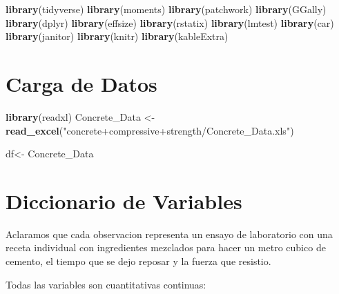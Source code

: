 \documentclass[
]{book}
\newenvironment{Shaded}{\begin{snugshade}}{\end{snugshade}}
\newcommand{\FunctionTok}[1]{\textcolor[rgb]{0.13,0.29,0.53}{\textbf{#1}}}
\newcommand{\NormalTok}[1]{#1}
\newcommand{\OtherTok}[1]{\textcolor[rgb]{0.56,0.35,0.01}{#1}}
\newcommand{\StringTok}[1]{\textcolor[rgb]{0.31,0.60,0.02}{#1}}
\begin{document}
\begin{Shaded}
\begin{Highlighting}[]
\FunctionTok{library}\NormalTok{(tidyverse) }
\FunctionTok{library}\NormalTok{(moments) }
\FunctionTok{library}\NormalTok{(patchwork) }
\FunctionTok{library}\NormalTok{(GGally) }
\FunctionTok{library}\NormalTok{(dplyr) }
\FunctionTok{library}\NormalTok{(effsize) }
\FunctionTok{library}\NormalTok{(rstatix)}
\FunctionTok{library}\NormalTok{(lmtest)   }
\FunctionTok{library}\NormalTok{(car)      }
\FunctionTok{library}\NormalTok{(janitor)  }
\FunctionTok{library}\NormalTok{(knitr)}
\FunctionTok{library}\NormalTok{(kableExtra)}
\end{Highlighting}
\end{Shaded}

\section{Carga de Datos}\label{carga-de-datos}

\begin{Shaded}
\begin{Highlighting}[]
\FunctionTok{library}\NormalTok{(readxl)}
\NormalTok{Concrete\_Data }\OtherTok{\textless{}{-}} \FunctionTok{read\_excel}\NormalTok{(}\StringTok{"concrete+compressive+strength/Concrete\_Data.xls"}\NormalTok{)}

\NormalTok{df}\OtherTok{\textless{}{-}}\NormalTok{ Concrete\_Data}
\end{Highlighting}
\end{Shaded}

\section{Diccionario de Variables}\label{diccionario-de-variables}

Aclaramos que cada observacion representa un ensayo de laboratorio con una receta individual con ingredientes mezclados para hacer un metro cubico de cemento, el tiempo que se dejo reposar y la fuerza que resistio.

Todas las variables son cuantitativas continuas:
\end{document}

